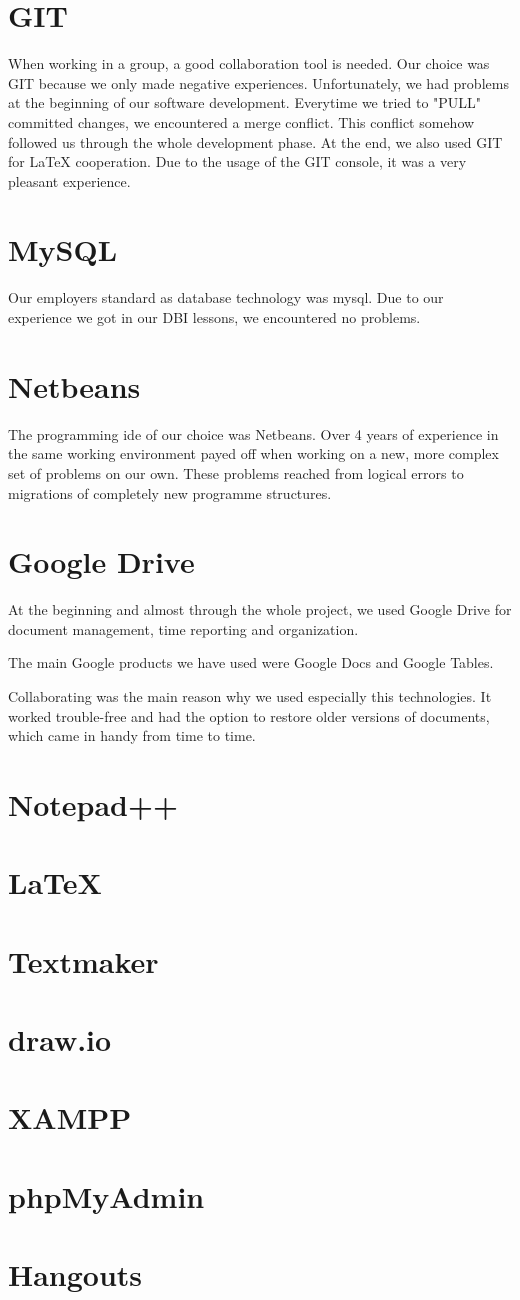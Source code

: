 \section{GIT}
When working in a group, a good collaboration tool is needed. Our choice was GIT because we only made negative experiences.\newline
Unfortunately, we had problems at the beginning of our software development. Everytime we tried to "PULL" committed changes, we encountered a merge conflict. This conflict somehow followed us through the whole development phase.\newline
At the end, we also used GIT for LaTeX cooperation. Due to the usage of the GIT console, it was a very pleasant experience.
\section{MySQL}
Our employers standard as database technology was \gls{mysql}. Due to our experience we got in our DBI lessons, we encountered no problems.
\section{Netbeans}
The programming \gls{ide} of our choice was Netbeans. Over 4 years of experience in the same working environment payed off when working on a new, more complex set of problems on our own. These problems reached from logical errors to migrations of completely new programme structures. 
\section{Google Drive}
At the beginning and almost through the whole project, we used Google Drive for document management, time reporting and organization.

The main Google products we have used were Google Docs and Google Tables.

Collaborating was the main reason why we used especially this technologies. It worked trouble-free and had the option to restore older versions of documents, which came in handy from time to time.
\section{Notepad++}

\section{LaTeX}

\section{Textmaker}

\section{draw.io}

\section{XAMPP}

\section{phpMyAdmin}

\section{Hangouts}
